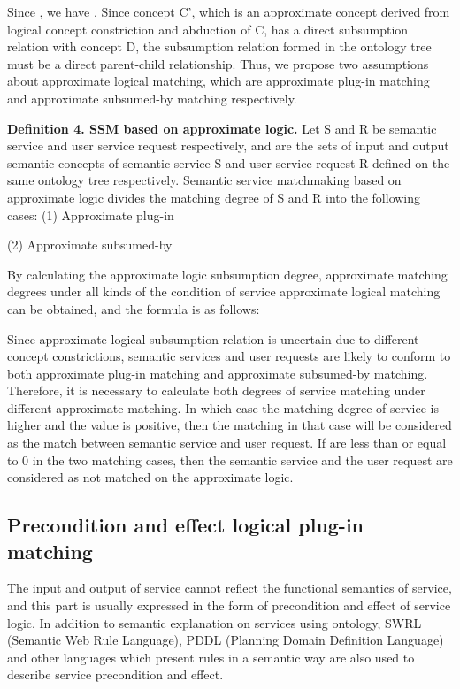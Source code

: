 \documentclass{ieeeaccess}
\begin{document}
Since  , we have .
Since concept C', which is an approximate concept derived from logical concept constriction and abduction of C, has a direct subsumption relation with concept D, the subsumption relation formed in the ontology tree must be a direct parent-child relationship. Thus, we propose two assumptions about approximate logical matching, which are approximate plug-in matching and approximate subsumed-by matching respectively.

\textbf{Definition 4. SSM based on approximate logic.} Let S and R be semantic service and user service request respectively, and   are the sets of input and output semantic concepts of semantic service S and user service request R defined on the same ontology tree respectively. Semantic service matchmaking based on approximate logic divides the matching degree of S and R into the following cases:
(1) Approximate plug-in
 
(2) Approximate subsumed-by
 
By calculating the approximate logic subsumption degree, approximate matching degrees under all kinds of the condition of service approximate logical matching can be obtained, and the formula is as follows:
 
Since approximate logical subsumption relation is uncertain due to different concept constrictions, semantic services and user requests are likely to conform to both approximate plug-in matching and approximate subsumed-by matching.
Therefore, it is necessary to calculate both degrees of service matching under different approximate matching.
In which case the matching degree of service is higher and the value is positive, then the matching in that case will be considered as the match between semantic service and user request.
If  are less than or equal to 0 in the two matching cases, then the semantic service and the user request are considered as not matched on the approximate logic.


\subsection{Precondition and effect logical plug-in matching}
The input and output of service cannot reflect the functional semantics of service, and this part is usually expressed in the form of precondition and effect of service logic. In addition to semantic explanation on services using ontology, SWRL (Semantic Web Rule Language), PDDL (Planning Domain Definition Language) and other languages which present rules in a semantic way are also used to describe service precondition and effect. 
\end{document}
